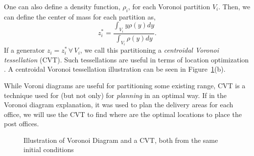 \documentclass{iacas}
\begin{document}
One can also define a density function, $\rho_i$, for each Voronoi partition $V_{i}$. Then, we can define the center of mass for each partition as,
\begin{equation}
z_{i}^{*} = \frac{\int_{V_{i}}y\rho(y)dy}{\int_{V_{i}}\rho(y)dy}.
\end{equation}
If a generator $z_{i} = z_{i}^{*} \, \forall \,V_{i}$, we call this partitioning a \emph{centroidal Voronoi tessellation} (CVT). Such tessellations are useful in terms of location optimization \cite{Cortes2004,Du1999,Atinc2013}.
A centroidal Voronoi tessellation illustration can be seen in Figure~\ref{fig:Voronoi_tessellation_illustration}(b). 

While Voroni diagrams are useful for partitioning some existing range, CVT is a technique used for (but not only) for \textit{planning} in an optimal way. If in the Voronoi diagram explanation, it was used to plan the delivery areas for each office, we will use the CVT to find where are the optimal locations to place the post offices.

\begin{figure}
	\captionsetup[subfigure]{position=b}
	\centering
	\label{fig:voronoi:voronoi}
	\caption{Illustration of Voronoi Diagram and a CVT, both from the same initial conditions}
\label{fig:Voronoi_tessellation_illustration}
\end{figure}
\end{document}
